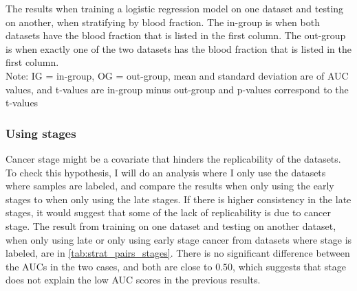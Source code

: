 {{{{{{{{{{\begin{table}
    \caption{The results when training a logistic regression model on one dataset and testing on another, when stratifying by blood fraction. The in-group is when both datasets have the blood fraction that is listed in the first column. The out-group is when exactly one of the two datasets has the blood fraction that is listed in the first column. \\
    Note: IG = in-group, OG = out-group, mean and standard deviation are of AUC values, and t-values are in-group minus out-group and p-values correspond to the t-values}
    \label{tab:strat_two_body_fluid}
\end{table}

\subsubsection{Using stages}
Cancer stage might be a covariate that hinders the replicability of the datasets. To check this hypothesis, I will do an analysis where I only use the datasets where samples are labeled, and compare the results when only using the early stages to when only using the late stages. If there is higher consistency in the late stages, it would suggest that some of the lack of replicability is due to cancer stage. The result from training on one dataset and testing on another dataset, when only using late or only using early stage cancer from datasets where stage is labeled, are in \autoref{tab:strat_pairs_stages}. There is no significant difference between the AUCs in the two cases, and both are close to $0.50$, which suggests that stage does not explain the low AUC scores in the previous results. 

}}}}}}}}}}
